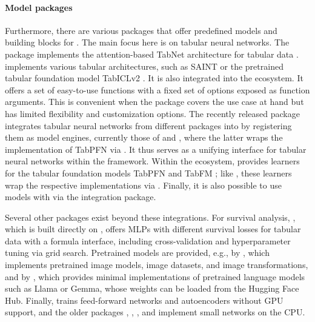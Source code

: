 \documentclass[article,shortnames]{jss}
\theoremstyle{definition}
\begin{document}
\paragraph{Model packages}
Furthermore, there are various packages that offer predefined models and building blocks for \torch{}.
The main focus here is on tabular neural networks.
The  \citep{ref-r-tabnet} package implements the attention-based TabNet architecture for tabular data \citep{ref-arik2021tabnet}.
 \citep{ref-brulee2025} implements various tabular architectures, such as SAINT \citep{ref-somepalli2021saint} or the pretrained tabular foundation model TabICLv2 \citep{ref-qu2026tabiclv2}.
It is also integrated into the \tidymodels{} ecosystem.
It offers a set of easy-to-use functions with a fixed set of options exposed as function arguments.
This is convenient when the package covers the use case at hand but has limited flexibility and customization options.
The recently released  package \citep{ref-tabby} integrates tabular neural networks from different \rlang{} packages into \tidymodels{} by registering them as  \citep{ref-parsnip} model engines, currently those of  and  \citep{ref-tabpfn-r, ref-hollmann2025tabpfn}, where the latter wraps the \python{} implementation of TabPFN via .
It thus serves as a unifying interface for tabular neural networks within the \tidymodels{} framework.
Within the \mlrt{} ecosystem,  \citep{ref-mlr3extralearners} provides learners for the tabular foundation models TabPFN \citep{ref-hollmann2025tabpfn} and TabFM \citep{ref-tabfm}; like , these learners wrap the respective \python{} implementations via .
Finally, it is also possible to use  models with \tidymodels{} via the  \citep{ref-kerasnip} integration package.

Several other packages exist beyond these \tidymodels{} integrations.
For survival analysis,  \citep{ref-elbadisy2026survdnn}, which is built directly on \torch{}, offers MLPs with different survival losses for tabular data with a formula interface, including cross-validation and hyperparameter tuning via grid search.
Pretrained models are provided, e.g., by  \citep{ref-r-torchvision}, which implements pretrained image models, image datasets, and image transformations, and by  \citep{ref-minhub}, which provides minimal \torch{} implementations of pretrained language models such as Llama or Gemma, whose weights can be loaded from the Hugging Face Hub.
Finally,  \citep{ref-h2o} trains feed-forward networks and autoencoders without GPU support, and the older packages , , , and  \citep{ref-nnet, ref-neuralnet, ref-deepnet, ref-rsnns} implement small networks on the CPU.
\end{document}
